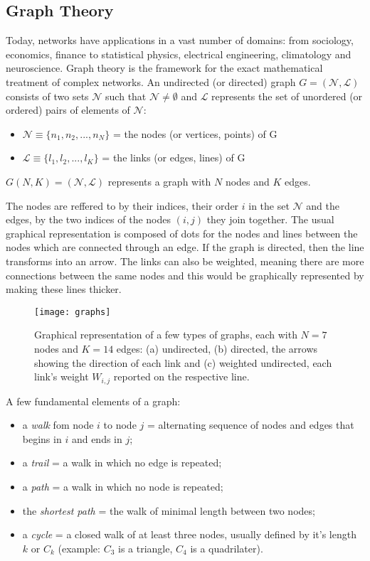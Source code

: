 \subsection{Graph Theory} 
Today, networks have applications in a vast number of domains: from sociology, economics, finance to statistical physics, electrical engineering, climatology and neuroscience. Graph theory is the framework for the exact mathematical treatment of complex networks. An undirected (or directed) graph $G=(\mathcal{N},\mathcal{L})$ consists of two sets $\mathcal{N}$ such that $\mathcal{N} \neq \emptyset$ and $\mathcal{L}$ represents the set of unordered (or ordered) pairs of elements of $\mathcal{N}$:
\begin{itemize}
	\item $\mathcal{N} \equiv \{ n_1,n_2,...,n_N \}$ = the nodes (or vertices, points) of G
	\item $\mathcal{L} \equiv \{ l_1,l_2,...,l_K \}$ = the links (or edges, lines) of G 
\end{itemize}
$G(N,K) = (\mathcal{N},\mathcal{L})$ represents a graph with $N$ nodes and $K$ edges.\par 
The nodes are reffered to by their indices, their order $i$ in the set $\mathcal{N}$ and the edges, by the two indices of the nodes $(i,j)$ they join together. The usual graphical representation is composed of dots for the nodes and lines between the nodes which are connected through an edge. If the graph is directed, then the line transforms into an arrow. The links can also be weighted, meaning there are more connections between the same nodes and this would be graphically represented by making these lines thicker.

\begin{figure}[!h]
  \centering
  \texttt{[image: graphs]}
  \caption{Graphical representation of a few types of graphs, each with $N=7$ nodes and $K=14$ edges: (a) undirected, (b) directed, the arrows showing the direction of each link and (c) weighted undirected, each link's weight $W_{i,j}$ reported on the respective line.}
  \label{fig:graphs}
\end{figure}

A few fundamental elements of a graph:
\begin{itemize}
	\item a {\it walk} fom node $i$ to node $j$ = alternating sequence of nodes and edges that begins in $i$ and ends in $j$;
	\item a {\it trail} = a walk in which no edge is repeated;
	\item a {\it path} = a walk in which no node is repeated;
	\item the {\it shortest path} = the walk of minimal length between two nodes;
	\item a {\it cycle} = a closed walk of at least three nodes, usually defined by it's length $k$ or $C_k$ (example: $C_3$ is a triangle, $C_4$ is a quadrilater).
\end{itemize}

